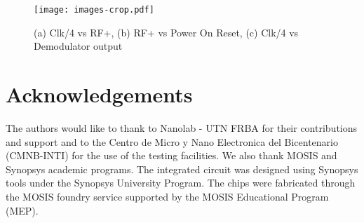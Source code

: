 \documentclass[conference]{../../resources/IEEEtran/IEEEtran}
\begin{document}
\begin{figure}[h]
  \centering
  \texttt{[image: images-crop.pdf]}
  \caption{(a) Clk/4 vs RF+, (b) RF+ vs Power On Reset, (c) Clk/4 vs Demodulator output}
  \label{fig:meas}
\end{figure}

\section{Acknowledgements}

The authors would like to thank to Nanolab - UTN FRBA for their contributions and support and to the Centro de Micro y Nano Electronica del Bicentenario (CMNB-INTI) for the use of the testing facilities. 
We also thank MOSIS and Synopsys academic programs.
The integrated circuit was designed using Synopsys tools under the Synopsys University Program. The chips were fabricated through the MOSIS foundry service supported by the MOSIS Educational Program (MEP).










\end{document}
